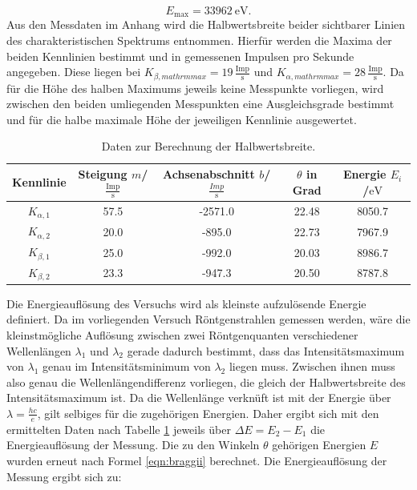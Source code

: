 \begin{equation*}
	E_\mathrm{max}=\SI{33962}{\electronvolt} \text{.}
\end{equation*}
Aus den Messdaten im Anhang wird die Halbwertsbreite beider sichtbarer Linien des charakteristischen Spektrums entnommen.
Hierfür werden die Maxima der beiden Kennlinien bestimmt und in gemessenen Impulsen pro Sekunde angegeben.
Diese liegen bei $K_{\beta,mathrm{max}}=19 \, \frac{\mathrm{Imp}}{\si{\second}}$ und $K_{\alpha,mathrm{max}}=28 \, \frac{\mathrm{Imp}}{\si{\second}}$.
Da für die Höhe des halben Maximums jeweils keine Messpunkte vorliegen, wird zwischen den beiden umliegenden Messpunkten eine Ausgleichsgrade bestimmt und für die halbe maximale Höhe der jeweiligen Kennlinie ausgewertet.
\begin{table}
	\centering
	\caption{Daten zur Berechnung der Halbwertsbreite.}
	\label{tab:moped}
	\begin{tabular}{ccccc}
		\toprule
Kennlinie&Steigung $m$/$ \frac{\mathrm{Imp}}{\si{\second}}$&Achsenabschnitt $b$/ $\frac{Imp}{\si{\second}}$&$\theta$ in Grad&Energie $E_i$/$\si{\electronvolt}$\\
\midrule
		$K_{\alpha,\mathrm{1}}$&57.5&-2571.0& 22.48&8050.7 \\
		$K_{\alpha,\mathrm{2}}$&20.0 &-895.0 &22.73&7967.9\\
		$K_{\beta,\mathrm{1}}$&25.0&-992.0&20.03&8986.7\\
		$K_{\beta,\mathrm{2}}$&23.3&-947.3&20.50&8787.8\\
		\bottomrule
\end{tabular}
\end{table}
Die Energieauflösung des Versuchs wird als kleinste aufzulösende Energie definiert.
Da im vorliegenden Versuch Röntgenstrahlen gemessen werden, wäre die kleinstmögliche Auflösung zwischen zwei Röntgenquanten verschiedener Wellenlängen $\lambda_1$ und $\lambda_2$ gerade dadurch bestimmt, dass das Intensitätsmaximum von $\lambda_1$ genau im Intensitätsminimum von $\lambda_2$ liegen muss. Zwischen ihnen muss also genau die Wellenlängendifferenz vorliegen, die gleich der Halbwertsbreite des Intensitätsmaximum ist. Da die Wellenlänge verknüft ist mit der Energie über $\lambda=\frac{hc}{e}$, gilt selbiges für die zugehörigen Energien.
Daher ergibt sich mit den ermittelten Daten nach Tabelle \ref{tab:moped} jeweils über $\Delta E=E_2-E_1$ die Energieauflösung der Messung.
Die zu den Winkeln $\theta$ gehörigen Energien $E$ wurden erneut nach Formel \eqref{eqn:braggii} berechnet.
Die Energieauflösung der Messung ergibt sich zu:
